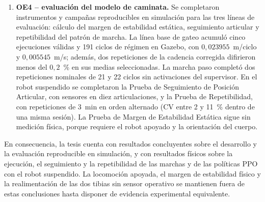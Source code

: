\begin{enumerate}
\item \textbf{OE4 -- evaluación del modelo de caminata.}
Se completaron instrumentos y campañas reproducibles en simulación para las
tres líneas de evaluación: cálculo del margen de estabilidad estática,
seguimiento articular y repetibilidad del patrón de marcha. La línea base de
gateo acumuló cinco ejecuciones válidas y 191 ciclos de régimen en Gazebo, con
$0{,}023955$~m/ciclo y $0{,}005545$~m/s; además, dos repeticiones de la
cadencia corregida difirieron menos del $0{,}2$~\% en sus medias seleccionadas.
La marcha paso completó dos repeticiones nominales de 21 y 22 ciclos sin
activaciones del supervisor. En el robot suspendido se completaron la Prueba de Seguimiento
de Posición Articular, con sensores en diez articulaciones, y la Prueba de
Repetibilidad, con repeticiones de 3~min en orden alternado (CV entre 2 y 11~\%
dentro de una misma sesión). La Prueba de Margen de Estabilidad Estática sigue
sin medición física, porque requiere el robot apoyado y la orientación del
cuerpo.
\end{enumerate}

En consecuencia, la tesis cuenta con resultados concluyentes sobre el
desarrollo y la evaluación reproducible en simulación, y con resultados
físicos sobre la ejecución, el seguimiento y la repetibilidad de las marchas y de
las políticas PPO con el robot suspendido. La locomoción apoyada, el margen de
estabilidad físico y la realimentación de las dos tibias sin sensor operativo se
mantienen fuera de estas conclusiones hasta disponer de evidencia experimental
equivalente.
